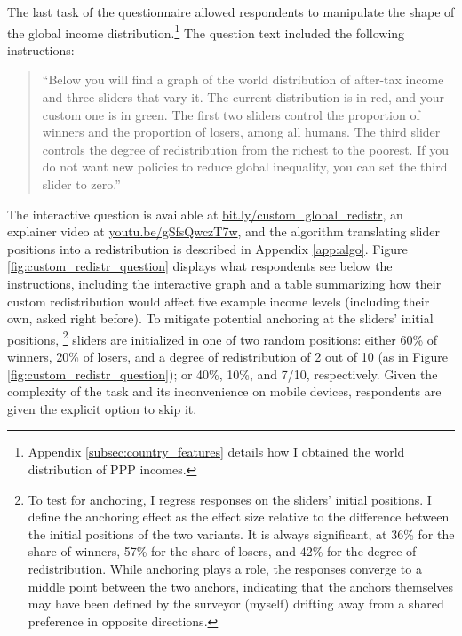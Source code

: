 \documentclass[12pt,english]{article}
\begin{document}
\begin{bibunit}
The last task of the questionnaire allowed respondents to manipulate the shape of the global income distribution.\footnote{Appendix \ref{subsec:country_features} details how I obtained the world distribution of PPP incomes. } The question text included the following instructions: 
\begin{quote}``Below you will find a graph of the world distribution of after-tax income and three sliders that vary it. The current distribution is in red, and your custom one is in green. The first two sliders control the proportion of winners and the proportion of losers, among all humans. The third slider controls the degree of redistribution from the richest to the poorest. 
If you do not want new policies to reduce global inequality, you can set the third slider to zero.''\end{quote} 
The interactive question is available at \href{http://preferences-pol.fr/custom_global_redistr.html}{bit.ly/custom\_global\_redistr}, an explainer video at \href{https://youtu.be/gSfsQwczT7w}{youtu.be/gSfsQwczT7w}, and the algorithm translating slider positions into a redistribution is described in Appendix \ref{app:algo}. 
Figure \ref{fig:custom_redistr_question} displays what respondents see below the instructions, including the interactive graph and a table summarizing how their custom redistribution would affect five example income levels (including their own, asked right before). To mitigate potential anchoring at the sliders' initial positions,%
\footnote{To test for anchoring, I regress responses on the sliders' initial positions. %
I define the anchoring effect as the effect size relative to the difference between the initial positions of the two variants. It is always significant, at 36\% for the share of winners, 57\% for the share of losers, and 42\% for the degree of redistribution. While anchoring plays a role, the responses converge to a middle point between the two anchors, indicating that the anchors themselves may have been defined by the surveyor (myself) drifting away from a shared preference in opposite directions. %
} 
sliders are initialized in one of two random positions: %
either %
60\% of winners, 20\% of losers, and a degree of redistribution of 2 out of 10 (as in Figure \ref{fig:custom_redistr_question}); or %
40\%, 10\%, and 7/10, respectively. 
Given the complexity of the task and its inconvenience on mobile devices, respondents are given the explicit option to skip it. 


\end{bibunit}
\end{document}
